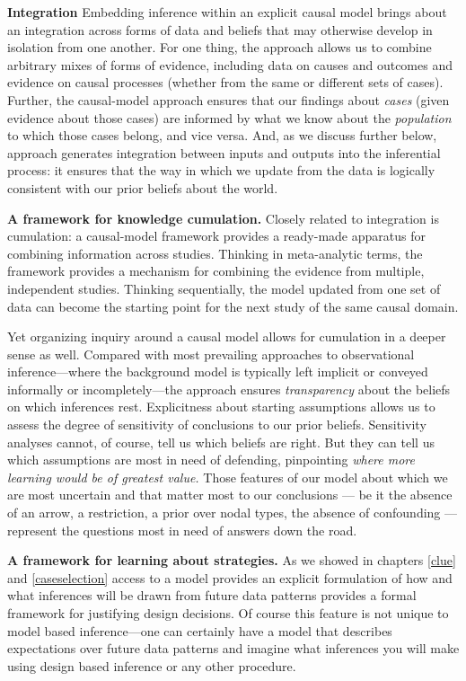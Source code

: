 \documentclass[
  12pt,
]{book}
\begin{document}
\textbf{Integration} Embedding inference within an explicit causal model brings about an integration across forms of data and beliefs that may otherwise develop in isolation from one another. For one thing, the approach allows us to combine arbitrary mixes of forms of evidence, including data on causes and outcomes and evidence on causal processes (whether from the same or different sets of cases). Further, the causal-model approach ensures that our findings about \emph{cases} (given evidence about those cases) are informed by what we know about the \emph{population} to which those cases belong, and vice versa. And, as we discuss further below, approach generates integration between inputs and outputs into the inferential process: it ensures that the way in which we update from the data is logically consistent with our prior beliefs about the world.

\textbf{A framework for knowledge cumulation.} Closely related to integration is cumulation: a causal-model framework provides a ready-made apparatus for combining information across studies. Thinking in meta-analytic terms, the framework provides a mechanism for combining the evidence from multiple, independent studies. Thinking sequentially, the model updated from one set of data can become the starting point for the next study of the same causal domain.

Yet organizing inquiry around a causal model allows for cumulation in a deeper sense as well. Compared with most prevailing approaches to observational inference---where the background model is typically left implicit or conveyed informally or incompletely---the approach ensures \emph{transparency} about the beliefs on which inferences rest. Explicitness about starting assumptions allows us to assess the degree of sensitivity of conclusions to our prior beliefs. Sensitivity analyses cannot, of course, tell us which beliefs are right. But they can tell us which assumptions are most in need of defending, pinpointing \emph{where more learning would be of greatest value.} Those features of our model about which we are most uncertain and that matter most to our conclusions --- be it the absence of an arrow, a restriction, a prior over nodal types, the absence of confounding --- represent the questions most in need of answers down the road.

\textbf{A framework for learning about strategies.} As we showed in chapters \ref{clue} and \ref{caseselection} access to a model provides an explicit formulation of how and what inferences will be drawn from future data patterns provides a formal framework for justifying design decisions. Of course this feature is not unique to model based inference---one can certainly have a model that describes expectations over future data patterns and imagine what inferences you will make using design based inference or any other procedure.
\end{document}
